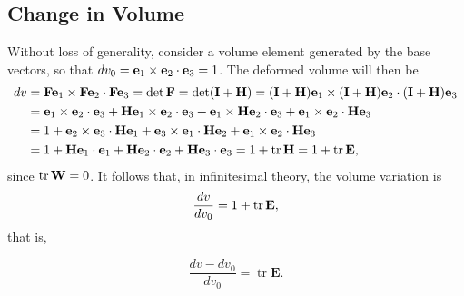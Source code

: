 \subsection{Change in Volume}
Without loss of generality, consider a volume element generated by the base vectors, so that $dv_0=\mathbf{e}_1\times\mathbf{e}_2\cdot\mathbf{e}_3=1$. The deformed volume will then be
\begin{equation}
	\begin{aligned}
		dv&=\mathbf{F}\mathbf{e}_1\times\mathbf{F}\mathbf{e}_2\cdot\mathbf{F}\mathbf{e}_3=\det\mathbf{F}=\det(\mathbf{I}+\mathbf{H})=(\mathbf{I}+\mathbf{H})\mathbf{e}_1\times(\mathbf{I}+\mathbf{H})\mathbf{e}_2\cdot(\mathbf{I}+\mathbf{H})\mathbf{e}_3\\
		&=\mathbf{e}_{1}\times\mathbf{e}_{2}\cdot\mathbf{e}_{3}+\mathbf{H}\mathbf{e}_{1}\times\mathbf{e}_{2}\cdot\mathbf{e}_{3}+\mathbf{e}_{1}\times\mathbf{H}\mathbf{e}_{2}\cdot\mathbf{e}_{3}+\mathbf{e}_{1}\times\mathbf{e}_{2}\cdot\mathbf{H}\mathbf{e}_{3}\\
		&=1+\mathbf{e}_{2}\times\mathbf{e}_{3}\cdot\mathbf{H}\mathbf{e}_{1}+\mathbf{e}_{3}\times\mathbf{e}_{1}\cdot\mathbf{H}\mathbf{e}_{2}+\mathbf{e}_{1}\times\mathbf{e}_{2}\cdot\mathbf{H}\mathbf{e}_{3}\\
		&=1+\mathbf{H}\mathbf{e}_{1}\cdot\mathbf{e}_{1}+\mathbf{H}\mathbf{e}_{2}\cdot\mathbf{e}_{2}+\mathbf{H}\mathbf{e}_{3}\cdot\mathbf{e}_{3}=1+\operatorname{tr}\mathbf{H}=1+\operatorname{tr}\mathbf{E},
	\end{aligned}
\end{equation}
since $\operatorname{tr}\mathbf{W}=0$. It follows that, in infinitesimal theory, the volume variation is
\begin{equation}
	\frac{dv}{dv_0}=1+\operatorname{tr}\mathbf{E},
\end{equation}
that is,
\begin{definition}
	\begin{equation}\label{trE}
		\frac{dv-dv_0}{dv_0}=\operatorname{tr}\mathbf{E}.
	\end{equation}
\end{definition}

